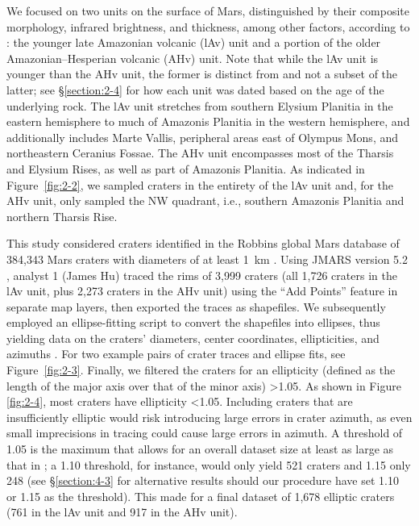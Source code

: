 \documentclass{ucetd}
\begin{document}
We focused on two units on the surface of Mars, distinguished by their composite morphology, infrared brightness, and thickness, among other factors, according to \citet{tanaka2014a}: the younger late Amazonian volcanic (lAv) unit and a portion of the older Amazonian--Hesperian volcanic (AHv) unit. Note that while the lAv unit is younger than the AHv unit, the former is distinct from and not a subset of the latter; see §\ref{section:2-4} for how each unit was dated based on the age of the underlying rock. The lAv unit stretches from southern Elysium Planitia in the eastern hemisphere to much of Amazonis Planitia in the western hemisphere, and additionally includes Marte Vallis, peripheral areas east of Olympus Mons, and northeastern Ceranius Fossae. The AHv unit encompasses most of the Tharsis and Elysium Rises, as well as part of Amazonis Planitia. As indicated in Figure~\ref{fig:2-2}, we sampled craters in the entirety of the lAv unit and, for the AHv unit, only sampled the NW quadrant, i.e., southern Amazonis Planitia and northern Tharsis Rise.

This study considered craters identified in the Robbins global Mars database of 384,343 Mars craters with diameters of at least 1~km \citet{robbins2012a}. Using JMARS version 5.2 \citep{christensen2009a}, analyst 1 (James Hu) traced the rims of 3,999 craters (all 1,726 craters in the lAv unit, plus 2,273 craters in the AHv unit) using the “Add Points” feature in separate map layers, then exported the traces as shapefiles. We subsequently employed an ellipse-fitting script to convert the shapefiles into ellipses, thus yielding data on the craters’ diameters, center coordinates, ellipticities, and azimuths \citep{gal2003a}. For two example pairs of crater traces and ellipse fits, see Figure~\ref{fig:2-3}. Finally, we filtered the craters for an ellipticity (defined as the length of the major axis over that of the minor axis) >1.05. As shown in Figure \ref{fig:2-4}, most craters have ellipticity <1.05. Including craters that are insufficiently elliptic would risk introducing large errors in crater azimuth, as even small imprecisions in tracing could cause large errors in azimuth. A threshold of 1.05 is the maximum that allows for an overall dataset size at least as large as that in \citet{holo2018a}; a 1.10 threshold, for instance, would only yield 521 craters and 1.15 only 248 (see §\ref{section:4-3} for alternative results should our procedure have set 1.10 or 1.15 as the threshold). This made for a final dataset of 1,678 elliptic craters (761 in the lAv unit and 917 in the AHv unit).
\end{document}
